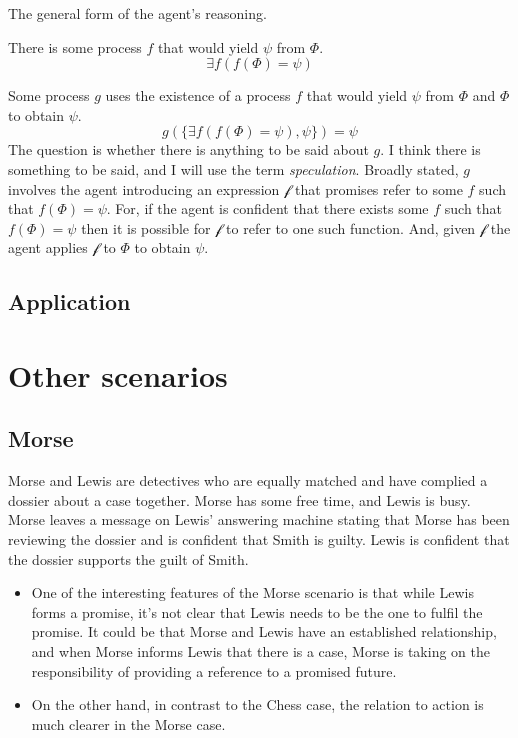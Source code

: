 \documentclass[10pt]{article}
\newcommand{\future}[1]{\ensuremath{\mathcal{#1}}}
\begin{document}
\begin{note}
  The general form of the agent's reasoning.
\end{note}

There is some process \(f\) that would yield \(\psi\) from \(\Phi\).
\[
\exists f(f(\Phi) = \psi)
\]

Some process \(g\) uses the existence of a process \(f\) that would yield \(\psi\) from \(\Phi\) and \(\Phi\) to obtain \(\psi\).
\[
  g(\{\exists f(f(\Phi) = \psi), \psi\}) = \psi
\]
The question is whether there is anything to be said about \(g\).
I think there is something to be said, and I will use the term \emph{speculation}.
Broadly stated, \(g\) involves the agent introducing an expression \(\future{f}\) that promises refer to some \(f\) such that \(f(\Phi) = \psi\).
For, if the agent is confident that there exists some \(f\) such that \(f(\Phi) = \psi\) then it is possible for \(\future{f}\) to refer to one such function.
And, given \(\future{f}\) the agent applies \(\future{f}\) to \(\Phi\) to obtain \(\psi\).

\subsection{Application}
\label{sec:application}




\section{Other scenarios}
\label{sec:other-scenarios}

\subsection{Morse}
\label{sec:morse-1}



\begin{scenario}[Morse]
  Morse and Lewis are detectives who are equally matched and have complied a dossier about a case together.
  Morse has some free time, and Lewis is busy.
  Morse leaves a message on Lewis' answering machine stating that Morse has been reviewing the dossier and is confident that Smith is guilty.
  Lewis is confident that the dossier supports the guilt of Smith.
\end{scenario}

\begin{note}
  \begin{itemize}
  \item One of the interesting features of the Morse scenario is that while Lewis forms a promise, it's not clear that Lewis needs to be the one to fulfil the promise.
    It could be that Morse and Lewis have an established relationship, and when Morse informs Lewis that there is a case, Morse is taking on the responsibility of providing a reference to a promised future.
  \item On the other hand, in contrast to the Chess case, the relation to action is much clearer in the Morse case.
  \end{itemize}
\end{note}
\end{document}
